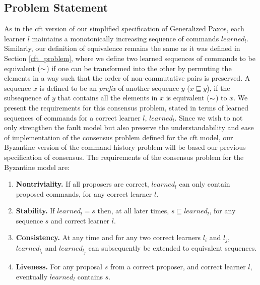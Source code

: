 \subsection{Problem Statement}
As in the \acrshort{cft} version of our simplified specification of Generalized Paxos, each learner $l$ maintains a monotonically increasing sequence of commands $learned_l$. Similarly, our definition of equivalence remains the same as it was defined in Section \ref{cft_problem}, where we define two learned sequences of commands to be equivalent ($\thicksim$) if one can be transformed into the other by permuting the elements in a way such that the order of non-commutative pairs is preserved. A sequence $x$ is defined to be an \textit{prefix} of another sequence $y$ ($x \sqsubseteq y$), if the subsequence of $y$ that contains all the elements in $x$ is equivalent ($\thicksim$) to $x$. 
We present the requirements for this consensus problem, stated in terms of learned sequences of commands for a correct learner $l$, $learned_l$. Since we wish to not only strengthen the fault model but also preserve the understandability and ease of implementation of the consensus problem defined for the \acrshort{cft} model, our Byzantine version of the command history problem will be based our previous specification of consensus. The requirements of the consensus problem for the Byzantine model are:\par
%
\begin{enumerate}
	\item \textbf{Nontriviality.} If all proposers are correct, $learned_l$ can only contain proposed commands, for any correct learner $l$.
	\item \textbf{Stability.} If $learned_l = s$ then, at all later times, $s \sqsubseteq learned_l$, for any sequence $s$ and correct learner $l$.
	\item \textbf{Consistency.} At any time and for any two correct learners $l_i$ and $l_j$, $learned_{l_i}$ and $learned_{l_j}$ can subsequently be extended to equivalent sequences.
	\item \textbf{Liveness.} For any proposal $s$ from a correct proposer, and correct learner $l$, eventually $learned_l$ contains $s$.
\end{enumerate}

